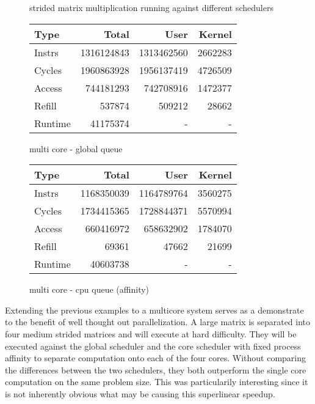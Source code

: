 \documentclass[11pt]{article}
\begin{document}
\begin{figure*}[!h]
	\caption{strided matrix multiplication running against different schedulers}		
	\centering
	\begin{subtable}{.48\linewidth}
		\centering
		\begin{tabular}{ l|rrr }
			Type    & Total     & User      & Kernel  \\
			\hline
            Instrs & 1316124843 & 1313462560 & 2662283 \\
            Cycles & 1960863928 & 1956137419 & 4726509 \\
            Access & 744181293 & 742708916 & 1472377 \\
            Refill & 537874 & 509212 & 28662 \\
            Runtime & 41175374 & - & - \\
			\hline
		\end{tabular}
		\caption{multi core - global queue}
	\end{subtable}
	\begin{subtable}{.48\linewidth} 
		\centering        
		\begin{tabular}{ l|rrr }
			Type    & Total     & User      & Kernel \\
			\hline
            Instrs & 1168350039 & 1164789764 & 3560275 \\
            Cycles & 1734415365 & 1728844371 & 5570994 \\
            Access & 660416972 & 658632902 & 1784070 \\
            Refill & 69361 & 47662 & 21699 \\
            Runtime & 40603738 & - & - \\
			\hline
		\end{tabular}
		\caption{multi core - cpu queue (affinity)}    
	\end{subtable}
\end{figure*}

Extending the previous examples to a multicore system serves as a demonstrate to the benefit of well thought out parallelization.  A large matrix is separated into four medium strided matrices and will execute at hard difficulty.  They will be executed against the global scheduler and the core scheduler with fixed process affinity to separate computation onto each of the four cores.  Without comparing the differences between the two schedulers, they both outperform the single core computation on the same problem size.  This was particularily interesting since it is not inherently obvious what may be causing this superlinear speedup.  
\end{document}
